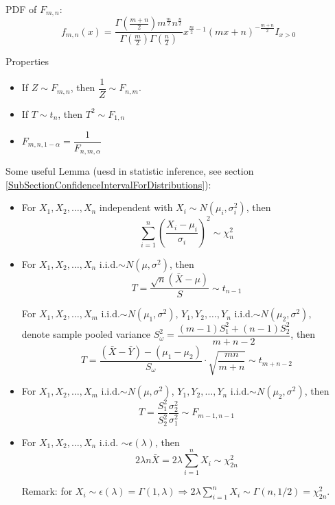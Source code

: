 \begin{itemize}
            PDF of $F_{m,n}$:
            \[
                f_{m,n}(x)=\frac{\Gamma(\frac{m+n}{2})m^\frac{m}{2}n^{\frac{n}{2}}}{\Gamma(\frac{m}{2})\Gamma(\frac{n}{2})}x^{\frac{m}{2}-1}(mx+n)^{-\frac{m+n}{2}} I_{x>0}
            \]

            Properties
            \begin{itemize}
                \item If $Z\sim F_{m,n}$, then $\dfrac{1}{Z}\sim F_{n,m}$.
                \item If $T\sim t_n$, then $T^2\sim F_{1,n}$
                \item $F_{m,n,1-\alpha}=\dfrac{1}{F_{n,m,\alpha}}$
            \end{itemize}
        \end{itemize}

        \begin{point}
            Some useful Lemma (uesd in statistic inference, see section \ref{SubSectionConfidenceIntervalForDistributions}):
        \end{point}
        
            
        \begin{itemize}
            \item For $X_1,X_2,\ldots,X_n$ independent with $X_i\sim N(\mu_i,\sigma^2_i)$, then
            \[
                \sum_{i=1}^n\left(\frac{X_i-\mu_i}{\sigma_i}\right)^2\sim \chi^2_n
            \]  
            \item For $X_1,X_2,\ldots,X_n$ i.i.d.$\sim N(\mu,\sigma^2)$, then
            \[
                T=\frac{\sqrt{n}(\bar{X}-\mu)}{S}\sim t_{n-1}   
            \]
            
            For $X_1,X_2,\ldots,X_m$ i.i.d.$\sim N(\mu_1,\sigma^2)$, $Y_1,Y_2,\ldots,Y_n$ i.i.d.$\sim N(\mu_2,\sigma^2)$, \\ denote sample pooled variance $S_{\omega}^2=\dfrac{(m-1)S^2_1+(n-1)S^2_2}{m+n-2}$, then
            \[
                T=\frac{(\bar{X}-\bar{Y})-(\mu_1-\mu_2)}{S_{\omega}}\cdot \sqrt{\frac{mn}{m+n}}\sim t_{m+n-2}
            \]
            \item For $X_1,X_2,\ldots,X_m$ i.i.d.$\sim N(\mu,\sigma^2)$, $Y_1,Y_2,\ldots,Y_n$ i.i.d.$\sim N(\mu_2,\sigma^2)$, then
            \[
                T=\frac{S_1^2}{S_2^2}\frac{\sigma^2_2}{\sigma^2_1}\sim F_{m-1,n-1}   
            \]
            \item For $X_1,X_2,\ldots,X_n$ i.i.d. $\sim \epsilon(\lambda)$, then
            \[
                2\lambda n\bar{X}=2\lambda\sum_{i=1}^nX_i \sim\chi^2_{2n} 
            \]

            Remark: for $X_i\sim\epsilon(\lambda)=\Gamma(1,\lambda)\Rightarrow 2\lambda\sum_{i=1}^nX_i\sim\Gamma(n,1/2)=\chi^2_{2n}$. 
        \end{itemize}

